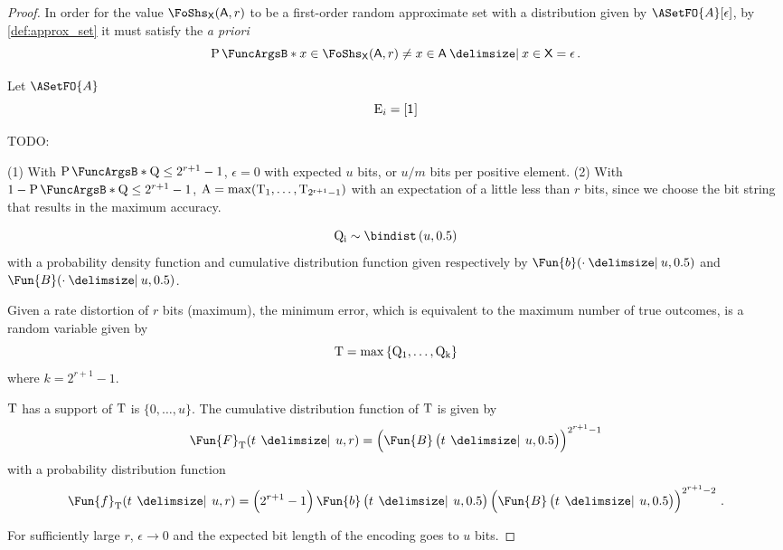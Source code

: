 \documentclass[ ../main.tex]{subfiles}
\begin{document}
\begin{proof}
    In order for the value $\FoShs_{\Set{X}}(\Set{A},r)$ to be a first-order random approximate set with a distribution given by $\ASetFO{A}[\epsilon]$, by \cref{def:approx_set} it must satisfy the \emph{a priori}
    \begin{equation}
        \Prob{x \in \FoShs_{\Set{X}}(\Set{A},r) \neq x \in \Set{A} \Given x \in \Set{X}} = \epsilon\,.
    \end{equation}
    
    Let $\ASetFO{A}$
    \begin{equation}
        \RV{E}_i = [\SetIndicator{}]
    \end{equation}
    
    
    
    TODO:
    
    (1) With $\Prob{\RV{Q} \leq 2^{r+1}-1}$, $\epsilon = 0$ with expected $u$ bits, or $u/m$ bits per positive element.
    (2) With $1-\Prob{\RV{Q} \leq 2^{r+1}-1}$, $\mathrm{A} = \max(\mathrm{T_1},\ldots,\mathrm{T_{2^{r+1}-1}})$ with an expectation of a little less than $r$ bits, since we choose the bit string that results in the maximum accuracy.
    
    \begin{equation}
        \RV{Q_i} \sim \bindist\left(u, 0.5\right)
    \end{equation}
    with a probability density function and cumulative distribution function given respectively by
    $\Fun{b}(\cdot \Given u, 0.5)$ and $\Fun{B}(\cdot \Given u, 0.5)$.
    
    Given a rate distortion of $r$ bits (maximum), the minimum error, which is equivalent to the maximum number of true outcomes, is a random variable given by
    \begin{equation}
        \mathrm{T} = \max\left\{\mathrm{Q_1}, \ldots, \mathrm{Q_k}\right\}
    \end{equation}
    where $k = 2^{r+1}-1$.
    
    $\mathrm{T}$ has a support of $\mathrm{T}$ is $\{0,\ldots,u\}$.
    The cumulative distribution function of $\mathrm{T}$ is given by
    \begin{equation}
        \Fun{F}_{\RV{T}}(t \,\Given \,u, r) = \left(\Fun{B}\left(t \,\Given \, u, 0.5\right)\right)^{2^{r+1}-1}
    \end{equation}
    with a probability distribution function
    \begin{equation}
        \Fun{f}_{\RV{T}}(t \,\Given \,u, r) = \left(2^{r+1}-1\right) \Fun{b}
        \left(t \,\Given \, u, 0.5\right) \left(\Fun{B}
        \left(t \,\Given \, u, 0.5\right)\right)^{2^{r+1}-2}\,.
    \end{equation}
    
    For sufficiently large $r$, $\epsilon \to 0$ and the expected bit length of the encoding goes to $u$ bits.
    
    
\end{proof}
\end{document}
